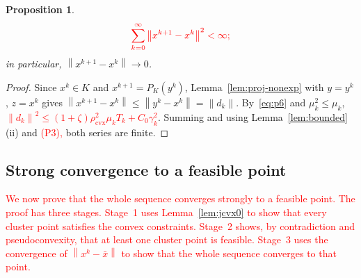 \documentclass[]{interact}
\theoremstyle{plain}
\newtheorem{proposition}[theorem]{Proposition}
\theoremstyle{definition}
\theoremstyle{remark}
\newcommand{\norm}[1]{\left\lVert #1 \right\rVert}
\newcommand{\cvx}{\mathrm{cvx}}
\begin{document}
\begin{proposition}\label{prop:regularity}
\[\textcolor{red}{
\sum_{k=0}^{\infty}\norm{x^{k+1}-x^k}^{2}<\infty;
}\]
in particular, $\norm{x^{k+1}-x^k}\to0$.
\end{proposition}
\begin{proof}
Since $x^k\in K$ and $x^{k+1}=P_K(y^k)$, Lemma~\ref{lem:proj-nonexp} with $y=y^k$, $z=x^k$ gives $\norm{x^{k+1}-x^k}\le\norm{y^k-x^k}=\norm{d_k}$. By~\eqref{eq:p6} and $\mu_k^2\le\mu_k$, \leavevmode\textcolor{red}{$\norm{d_k}^2\le(1+\zeta)\rho_{\cvx}^2\mu_k T_k+C_0\gamma_k^2$}. Summing and using Lemma~\ref{lem:bounded}(ii) and \leavevmode\textcolor{red}{(P3),} both series are finite.
\end{proof}

\subsection{Strong convergence to a feasible point}\label{ssec:strong}
\leavevmode\textcolor{red}{We now prove that the whole sequence converges strongly to a feasible point. The proof has three stages. Stage~1 uses Lemma~\ref{lem:jcvx0} to show that every cluster point satisfies the convex constraints. Stage~2 shows, by contradiction and pseudoconvexity, that at least one cluster point is feasible. Stage~3 uses the convergence of $\norm{x^k-\bar x}$ to show that the whole sequence converges to that point.}
\end{document}
